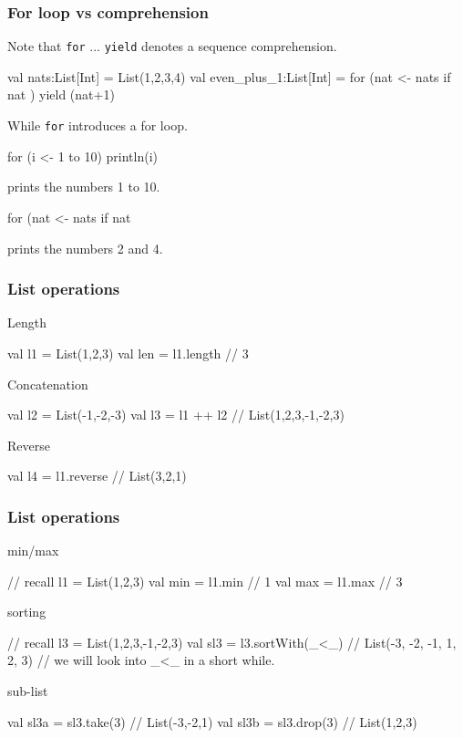 \documentclass{beamer}
\newcommand{\beb}{\begin{exampleblock}}
\newcommand{\eeb}{\end{exampleblock}}
\begin{document}

\begin{frame}[fragile]
\frametitle{For loop vs comprehension}
Note that {\tt for} ... {\tt yield} denotes a sequence comprehension. 
\beb{}
\begin{code}
val nats:List[Int] = List(1,2,3,4)
val even_plus_1:List[Int] = for (nat <- nats
                                 if nat %
                                ) yield (nat+1)
\end{code}
\eeb
While {\tt for} introduces a for loop.
\beb{}
\begin{code}
for (i <- 1 to 10) { println(i) }
\end{code}
\eeb
%
prints the numbers 1 to 10.
\beb{}
\begin{code}
for (nat <- nats if nat %
\end{code}
%
\eeb
prints the numbers 2 and 4.
\end{frame}



\begin{frame}[fragile]
\frametitle{List operations}
\beb{Length}
\begin{code}
val l1 = List(1,2,3)
val len = l1.length // 3
\end{code}
\eeb
\beb{Concatenation}
\begin{code}
val l2 = List(-1,-2,-3)
val l3 = l1 ++ l2 // List(1,2,3,-1,-2,3)
\end{code}
\eeb
\beb{Reverse}
\begin{code}
val l4 = l1.reverse // List(3,2,1)
\end{code}
\eeb
\end{frame}


\begin{frame}[fragile]
\frametitle{List operations}
\beb{min/max}
\begin{code}
// recall l1 = List(1,2,3)
val min = l1.min // 1
val max = l1.max // 3
\end{code}
\eeb
\beb{sorting}
\begin{code}
// recall l3 = List(1,2,3,-1,-2,3)
val sl3 = l3.sortWith(_<_) // List(-3, -2, -1, 1, 2, 3)
// we will look into _<_ in a short while.
\end{code}
\eeb
\beb{sub-list}
\begin{code}
val sl3a = sl3.take(3) // List(-3,-2,1)
val sl3b = sl3.drop(3) // List(1,2,3)
\end{code}
\eeb
\end{frame}
\end{document}
